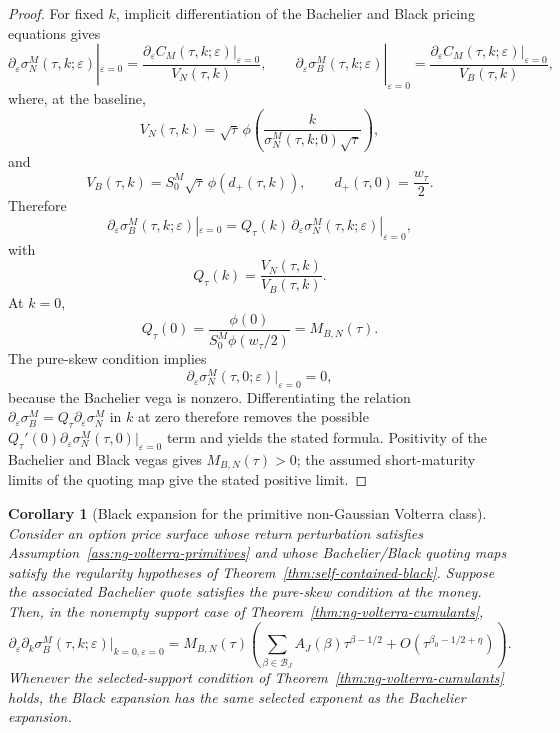 \documentclass[11pt,a4paper]{amsart}
\theoremstyle{plain}
\newtheorem{corollary}[theorem]{Corollary}
\theoremstyle{definition}
\theoremstyle{remark}
\begin{document}
\begin{proof}
For fixed \(k\), implicit differentiation of the Bachelier and Black pricing equations gives
\[
        \partial_\varepsilon\sigma_N^M(\tau,k;\varepsilon)|_{\varepsilon=0}
        =
        \frac{\partial_\varepsilon C_M(\tau,k;\varepsilon)|_{\varepsilon=0}}{V_N(\tau,k)},
        \qquad
        \partial_\varepsilon\sigma_B^M(\tau,k;\varepsilon)|_{\varepsilon=0}
        =
        \frac{\partial_\varepsilon C_M(\tau,k;\varepsilon)|_{\varepsilon=0}}{V_B(\tau,k)},
\]
where, at the baseline,
\[
        V_N(\tau,k)=\sqrt\tau\,\phi\!\left(
        \frac{k}{\sigma_N^M(\tau,k;0)\sqrt\tau}\right),
\]
and
\[
        V_B(\tau,k)=S_0^M\sqrt\tau\,\phi(d_+(\tau,k)),
        \qquad
        d_+(\tau,0)=\frac{w_\tau}{2}.
\]
Therefore
\[
        \partial_\varepsilon\sigma_B^M(\tau,k;\varepsilon)|_{\varepsilon=0}
        =
        Q_\tau(k)\,
        \partial_\varepsilon\sigma_N^M(\tau,k;\varepsilon)|_{\varepsilon=0},
\]
with
\[
        Q_\tau(k)=\frac{V_N(\tau,k)}{V_B(\tau,k)}.
\]
At \(k=0\),
\[
        Q_\tau(0)=\frac{\phi(0)}{S_0^M\phi(w_\tau/2)}=M_{B,N}(\tau).
\]
The pure-skew condition implies
\[
        \partial_\varepsilon\sigma_N^M(\tau,0;\varepsilon)|_{\varepsilon=0}=0,
\]
because the Bachelier vega is nonzero.  Differentiating the relation
\(\partial_\varepsilon\sigma_B^M=Q_\tau\partial_\varepsilon\sigma_N^M\) in \(k\) at zero therefore
removes the possible \(Q_\tau'(0)\partial_\varepsilon\sigma_N^M(\tau,0)|_{\varepsilon=0}\) term and
yields the stated formula.  Positivity of the Bachelier and Black vegas gives
\(M_{B,N}(\tau)>0\); the assumed short-maturity limits of the quoting map give the stated positive
limit.
\end{proof}

\begin{corollary}[Black expansion for the primitive non-Gaussian Volterra class]\label{cor:black-ng-volterra}
Consider an option price surface whose return perturbation satisfies
Assumption~\ref{ass:ng-volterra-primitives} and whose Bachelier/Black quoting maps satisfy the
regularity hypotheses of Theorem~\ref{thm:self-contained-black}.  Suppose the associated Bachelier
quote satisfies the pure-skew condition at the money.  Then, in the nonempty support case of
Theorem~\ref{thm:ng-volterra-cumulants},
\[
        \partial_\varepsilon\partial_k\sigma_B^M(\tau,k;\varepsilon)
        \big|_{k=0,\varepsilon=0}
        =
        M_{B,N}(\tau)
        \left(
                \sum_{\beta\in\mathcal B_J}A_J(\beta)\tau^{\beta-1/2}
                +O(\tau^{\beta_0-1/2+\eta})
        \right).
\]
Whenever the selected-support condition of Theorem~\ref{thm:ng-volterra-cumulants} holds, the
Black expansion has the same selected exponent as the Bachelier expansion.
\end{corollary}
\end{document}
